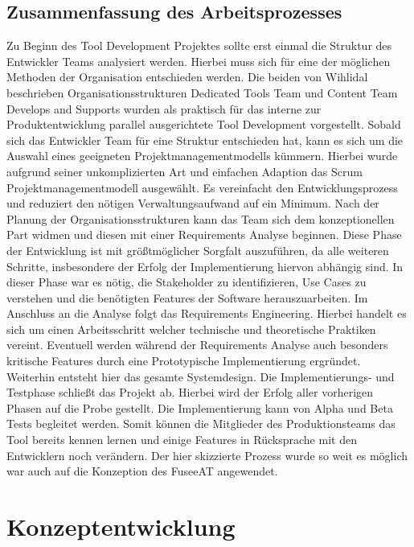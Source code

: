 \documentclass[pagesize, paper=a4, fontsize=12pt, titlepage=true, headings=small, headnosepline, abstractoff, liststotoc, nochapterprefix, plainheadsepline, twoside]{scrreprt}
\begin{document}
\section{Zusammenfassung des Arbeitsprozesses}
Zu Beginn des Tool Development Projektes sollte erst einmal die Struktur des Entwickler Teams analysiert werden. Hierbei muss sich für eine der möglichen Methoden der Organisation entschieden werden. Die beiden von Wihlidal \cite[S. ]{Wihlidal2006} beschrieben Organisationsstrukturen \glqq Dedicated Tools Team\grqq{} und \glqq Content Team Develops and Supports\grqq{} wurden als praktisch für das interne zur Produktentwicklung parallel ausgerichtete Tool Development vorgestellt. Sobald sich das Entwickler Team für eine Struktur entschieden hat, kann es sich um die Auswahl eines geeigneten Projektmanagementmodells kümmern. Hierbei wurde aufgrund seiner unkomplizierten Art und einfachen Adaption das Scrum Projektmanagementmodell ausgewählt. Es vereinfacht den Entwicklungsprozess und reduziert den nötigen Verwaltungsaufwand auf ein Minimum.
Nach der Planung der Organisationsstrukturen kann das Team sich dem konzeptionellen Part widmen und diesen mit einer Requirements Analyse beginnen. Diese Phase der Entwicklung ist mit größtmöglicher Sorgfalt auszuführen, da alle weiteren Schritte, insbesondere der Erfolg der Implementierung hiervon abhängig sind. In dieser Phase war es nötig, die Stakeholder zu identifizieren, Use Cases zu verstehen und die benötigten Features der Software herauszuarbeiten. Im Anschluss an die Analyse folgt das Requirements Engineering. Hierbei handelt es sich um einen Arbeitsschritt welcher technische und theoretische Praktiken vereint. Eventuell werden während der Requirements Analyse auch besonders kritische Features durch eine Prototypische Implementierung ergründet. Weiterhin entsteht hier das gesamte Systemdesign.
Die Implementierungs- und Testphase schließt das Projekt ab. Hierbei wird der Erfolg aller vorherigen Phasen auf die Probe gestellt. Die Implementierung kann von Alpha und Beta Tests begleitet werden. Somit können die Mitglieder des Produktionsteams das Tool bereits kennen lernen und einige Features in Rücksprache mit den Entwicklern noch verändern.
Der hier skizzierte Prozess wurde so weit es möglich war auch auf die Konzeption des FuseeAT angewendet.

\chapter{Konzeptentwicklung}
\end{document}
